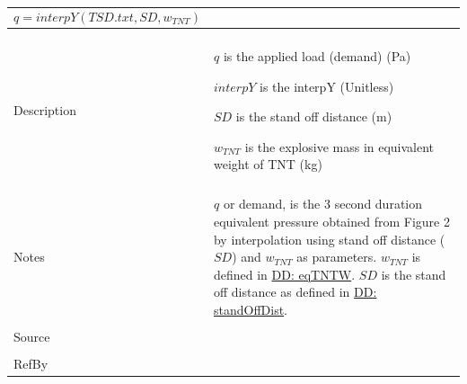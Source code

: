 \documentclass[12pt]{article}
\begin{document}
\begin{minipage}{\textwidth}
\begin{tabular}{p{} p{}}
\begin{displaymath}
                                                                             q=interpY\left(TSD.txt,SD,{w_{TNT}}\right)
                                                                             \end{displaymath}
                                                                             \\ \midrule \\
                                                                             Description & \begin{symbDescription}
                                                                                           \item{$q$ is the applied load (demand) (Pa)}
                                                                                           \item{$interpY$ is the interpY (Unitless)}
                                                                                           \item{$SD$ is the stand off distance (m)}
                                                                                           \item{${w_{TNT}}$ is the explosive mass in equivalent weight of TNT (kg)}
                                                                                           \end{symbDescription}
                                                                                           \\ \midrule \\
                                                                                           Notes & $q$ or demand, is the 3 second duration equivalent pressure obtained from Figure 2 by interpolation using stand off distance ($SD$) and ${w_{TNT}}$ as parameters. ${w_{TNT}}$ is defined in \hyperref[DD:eqTNTW]{DD: eqTNTW}. $SD$ is the stand off distance as defined in \hyperref[DD:standOffDist]{DD: standOffDist}.
                                                                                                   \\ \midrule \\
                                                                                                   Source & \cite{astm2009}
                                                                                                            \\ \midrule \\
                                                                                                            RefBy & 
\\ \bottomrule \end{tabular}
\end{minipage}
\end{document}
